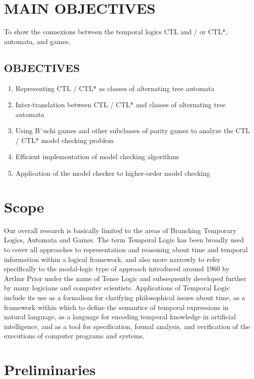 \documentclass[12pt,letterpaper]{article}
\begin{document}
{\section{MAIN OBJECTIVES}
 To show the connexions between the temporal logics CTL and / or CTL*, automata, and games.
\subsection{OBJECTIVES}
  \begin{enumerate}
    \item Representing CTL / CTL* as classes of alternating tree automata\\
    \item Inter-translation between CTL / CTL* and classes of alternating tree automata\\
    \item Using B¨uchi games and other subclasses of parity games to analyze the CTL / CTL* model checking problem\\
    \item Efficient implementation of model checking algorithms\\
    \item Application of the model checker to higher-order model checking\\
  \end{enumerate}
\section{Scope}
Our overall research is basically limited to the areas of Branching Temporary Logics, Automata and Games. The term Temporal Logic has been broadly used to cover all approaches to representation and reasoning about time and temporal information within a logical framework, and also more narrowly to refer specifically to the modal-logic type of approach introduced around 1960 by Arthur Prior under the name of Tense Logic and subsequently developed further by many logicians and computer scientists. Applications of Temporal Logic include its use as a formalism for clarifying philosophical issues about time, as a framework within which to define the semantics of temporal expressions in natural language, as a language for encoding temporal knowledge in artificial intelligence, and as a tool for specification, formal analysis, and verification of the executions of computer programs and systems.
\section{Preliminaries}

}
\end{document}
